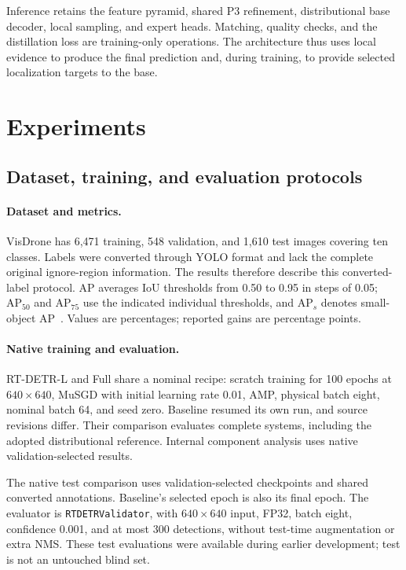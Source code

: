 Inference retains the feature pyramid, shared P3 refinement, distributional base decoder, local sampling, and expert heads. Matching, quality checks, and the distillation loss are training-only operations. The architecture thus uses local evidence to produce the final prediction and, during training, to provide selected localization targets to the base.

\section{Experiments}
\subsection{Dataset, training, and evaluation protocols}
\paragraph{Dataset and metrics.}
VisDrone has 6,471 training, 548 validation, and 1,610 test images covering ten classes. Labels were converted through YOLO format and lack the complete original ignore-region information. The results therefore describe this converted-label protocol. AP averages IoU thresholds from 0.50 to 0.95 in steps of 0.05; $\mathrm{AP}_{50}$ and $\mathrm{AP}_{75}$ use the indicated individual thresholds, and $\mathrm{AP}_{s}$ denotes small-object AP~\cite{lin2014coco}. Values are percentages; reported gains are percentage points.

\paragraph{Native training and evaluation.}
RT-DETR-L and Full share a nominal recipe: scratch training for 100 epochs at $640\times640$, MuSGD with initial learning rate 0.01, AMP, physical batch eight, nominal batch 64, and seed zero. Baseline resumed its own run, and source revisions differ. Their comparison evaluates complete systems, including the adopted distributional reference. Internal component analysis uses native validation-selected results.

The native test comparison uses validation-selected checkpoints and shared converted annotations. Baseline's selected epoch is also its final epoch. The evaluator is \texttt{RTDETRValidator}, with $640\times640$ input, FP32, batch eight, confidence 0.001, and at most 300 detections, without test-time augmentation or extra NMS. These test evaluations were available during earlier development; test is not an untouched blind set.

